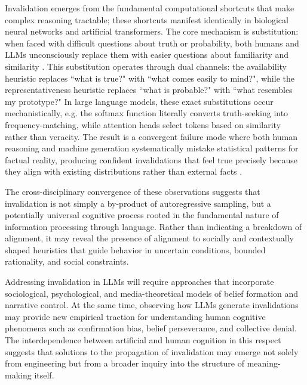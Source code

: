 \documentclass[12pt]{article}
\theoremstyle{definition}
\begin{document}
Invalidation emerges from the fundamental computational shortcuts that make complex reasoning tractable; these shortcuts manifest identically in biological neural networks and artificial transformers. The core mechanism is substitution: when faced with difficult questions about truth or probability, both humans and LLMs unconsciously replace them with easier questions about familiarity and similarity \parencite{tversky1974judgment, kunda1990motivated}. This substitution operates through dual channels: the availability heuristic replaces ``what is true?" with ``what comes easily to mind?", while the representativeness heuristic replaces ``what is probable?" with ``what resembles my prototype?" In large language models, these exact substitutions occur mechanistically, e.g. the softmax function literally converts truth-seeking into frequency-matching, while attention heads select tokens based on similarity rather than veracity. The result is a convergent failure mode where both human reasoning and machine generation systematically mistake statistical patterns for factual reality, producing confident invalidations that feel true precisely because they align with existing distributions rather than external facts \parencite{kunda1990motivated}.

The cross-disciplinary convergence of these observations suggests that invalidation 
%
%
is not simply a by-product of autoregressive sampling, but a potentially universal cognitive process rooted in the fundamental nature of information processing through language. 
%
%
%
%
Rather than indicating a breakdown of alignment, it may reveal the presence of alignment to socially and contextually shaped heuristics that guide behavior in uncertain conditions, bounded rationality, and social constraints.


Addressing invalidation in LLMs will require approaches that incorporate sociological, psychological, and media-theoretical models of belief formation and narrative control. At the same time, observing how LLMs generate invalidations may provide new empirical traction for understanding human cognitive phenomena such as confirmation bias, belief perseverance, and collective denial. The interdependence between artificial and human cognition in this respect suggests that solutions to the propagation of invalidation may emerge not solely from engineering but from a broader inquiry into the structure of meaning-making itself.
\end{document}
